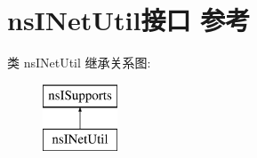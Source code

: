 \hypertarget{interfacens_i_net_util}{}\section{ns\+I\+Net\+Util接口 参考}
\label{interfacens_i_net_util}
类 ns\+I\+Net\+Util 继承关系图\+:\begin{figure}[H]
\begin{center}
\leavevmode
\includegraphics[height=2.000000cm]{interfacens_i_net_util}
\end{center}
\end{figure}
